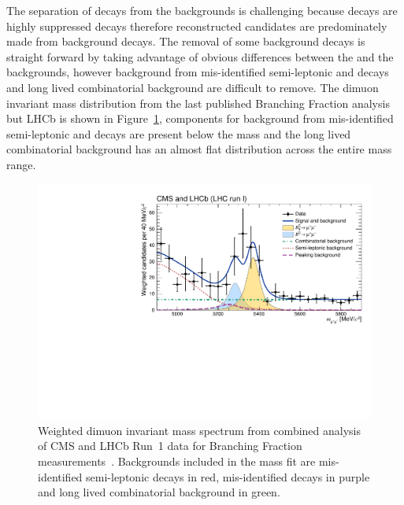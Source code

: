 The separation of \bsmumu decays from the backgrounds is challenging because \bsmumu decays are highly suppressed decays therefore reconstructed candidates are predominately made from background decays.
The removal of some background decays is straight forward by taking advantage of obvious differences between the \bsmumu and the backgrounds, however background from mis-identified semi-leptonic and \bhh decays and long lived combinatorial background are difficult to remove. The dimuon invariant mass distribution from the last published \bmumu Branching Fraction analysis but LHCb is shown in Figure~\ref{fig:LHCbCMS}, components for background from mis-identified semi-leptonic and \bhh decays are present below the \bs mass and the long lived combinatorial background has an almost flat distribution across the entire mass range. 


\begin{figure}[htbp]
    \centering
        \includegraphics[width= 0.8 \textwidth]{./Figs/Selection/CMSLHCb_fig2.pdf}
    \caption{Weighted dimuon invariant mass spectrum from combined analysis of CMS and LHCb Run~1 data for \bmumu Branching Fraction measurements~\cite{CMS:2014xfa}. Backgrounds included in the mass fit are mis-identified semi-leptonic decays in red, mis-identified \bhh decays in purple and long lived combinatorial background in green. }
    \label{fig:LHCbCMS}
\end{figure}

